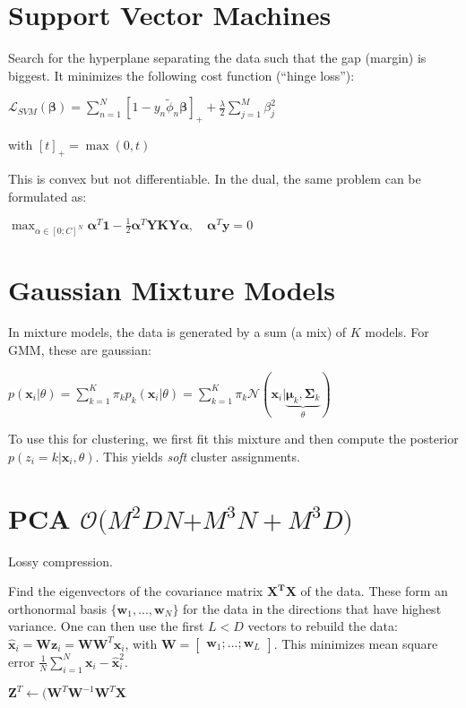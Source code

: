 \documentclass[10pt,a4paper,landscape]{article}
\renewcommand{\bf}[1]{\ensuremath{\mathbf{#1}}}
\newcommand{\balpha}{\boldsymbol\alpha}
\newcommand{\bbeta}{\boldsymbol\beta}
\begin{document}
\begin{multicols*}{4}
\section{Support Vector Machines}
Search for the hyperplane separating the data such that the gap (margin) is biggest.
It minimizes the following cost function (``hinge loss''):

$\mathcal{L}_{SVM} (\bbeta)= \sum_{n=1}^N [1 - y_n \tilde\phi_n \bbeta]_{+} + \frac{\lambda}{2} \sum_{j=1}^M \beta_j^2$

with $[t]_{+} = \max(0, t)$

This is convex but not differentiable. In the dual, the same problem can be formulated as:

$\max_{\alpha \in [0; C]^N} \balpha^T \bf{1} - \frac{1}{2} \balpha^T \bf{Y K Y} \balpha , \quad \balpha^T \bf{y} = 0$

\section{Gaussian Mixture Models}
In mixture models, the data is generated by a sum (a mix) of $K$ models. For GMM, these are gaussian:

$p(\bf{x}_i | \theta) = \sum_{k=1}^K \pi_k p_k(\bf{x}_i | \theta) =  \sum_{k=1}^K \pi_k \mathcal{N}(\bf{x}_i | \underbrace{\bf{\mu}_k, \bf{\Sigma}_k}_{\theta})$

To use this for clustering, we first fit this mixture and then compute the posterior $p(z_i = k | \bf{x}_i, \theta)$. This yields \textit{soft} cluster assignments.

\section{PCA \small $\mathcal{O}(M^2DN$\tiny$+M^3N+M^3D$\small$)$}
Lossy compression.

Find the eigenvectors of the covariance matrix $\bf{X^T X}$ of the data. These form an orthonormal basis $\{ \bf{w}_1, ..., \bf{w}_N\}$ for the data in the directions that have highest variance.
One can then use the first $L < D$ vectors to rebuild the data: $\bf{\hat{x}}_i = \bf{W} \bf{z}_i = \bf{W} \bf{W}^T \bf{x}_i$, with $\bf{W} = \begin{bmatrix} \bf{w}_1 ; ... ; \bf{w}_L \end{bmatrix}$.
This minimizes mean square error $\frac{1}{N} \sum_{i=1}^N \bf{x}_i - \bf{\hat{x}}_i^2$.


$\bf{Z}^T \leftarrow (\bf{W}^T\bf{W}^{-1}\bf{W}^T\bf{X}$



\end{multicols*}
\end{document}
